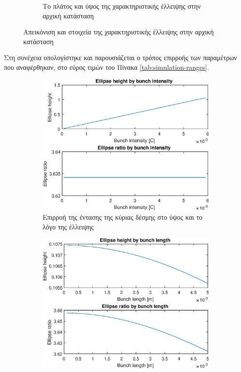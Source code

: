 \begin{figure}[tph]
\begin{subfigure}{0.47\textwidth}
		\centering
		\caption{Το πλάτος και ύψος της χαρακτηριστικής έλλειψης στην αρχική κατάσταση}
		\label{fig:MATLAB-variable-analysis-initial-ellipse-height-width}
	\end{subfigure}
\caption{Απεικόνιση και στοιχεία της χαρακτηριστικής έλλειψης στην αρχική κατάσταση}
\label{fig:MATLAB-initial-ellipse}
\end{figure}

Στη συνέχεια υπολογίστηκε και παρουσιάζεται ο τρόπος επιρροής των παραμέτρων που αναφέρθηκαν, στο εύρος τιμών του Πίνακα \ref{tab:simulation-ranges}.


\begin{figure}[tph]	
	\centering
	\begin{subfigure}{0.47\textwidth}
		\includegraphics[width=\linewidth]{figures/MATLAB-variable-analysis/EBS-variables-intensity}
		\centering
		\caption{Επιρροή της έντασης της κύριας δέσμης στο ύψος και το λόγο της έλλειψης}
		\label{fig:EBS-variables-intensity}
	\end{subfigure}
	\hfill
	\begin{subfigure}{0.47\textwidth}
		\includegraphics[width=\linewidth]{figures/MATLAB-variable-analysis/EBS-variables-length}

\end{subfigure}
\end{figure}
